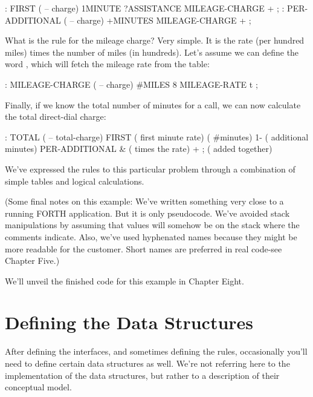 
\begin{Code}
: FIRST   ( -- charge)
   1MINUTE ?ASSISTANCE MILEAGE-CHARGE + ;
: PER-ADDITIONAL   ( -- charge)
   +MINUTES MILEAGE-CHARGE + ;
\end{Code}

\noindent What is the rule for the mileage charge? Very simple. It is the rate (per
hundred miles) times the number of miles (in hundreds). Let's assume we
can define the word , which will fetch the mileage
rate from the table:

\begin{Code}
: MILEAGE-CHARGE   ( -- charge)
   #MILES 8 MILEAGE-RATE t ;
\end{Code}

\noindent Finally, if we know the total number of minutes for a call, we can now
calculate the total direct-dial charge:

\begin{Code}
: TOTAL   ( -- total-charge)
   FIRST                        ( first minute rate)
   ( #minutes) 1-               ( additional minutes)
      PER-ADDITIONAL &          ( times the rate)
   + ;                          ( added together)
\end{Code}

\noindent We've expressed the rules to this particular problem through a
combination of simple tables and logical calculations.

(Some final notes on this example: We've written something very
close to a running FORTH application. But it is only pseudocode. We've
avoided stack manipulations by assuming that values will somehow be
on the stack where the comments indicate. Also, we've used hyphenated
names because they might be more readable for the customer. Short
names are preferred in real code-see Chapter Five.)

We'll unveil the finished code for this example in Chapter Eight.

\section{Defining the Data Structures}

\noindent After defining the interfaces, and sometimes defining the rules,
occasionally you'll need to define certain data structures as well. We're not
referring here to the implementation of the data structures, but rather to
a description of their conceptual model.


